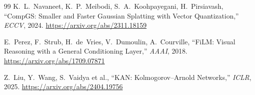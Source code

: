 \begin{thebibliography}{99}
 K.~L.~Navaneet, K.~P.~Meibodi, S.~A.~Koohpayegani, H.~Pirsiavash,
``CompGS: Smaller and Faster Gaussian Splatting with Vector Quantization,''
\textit{ECCV}, 2024. \url{https://arxiv.org/abs/2311.18159}

 E.~Perez, F.~Strub, H.~de~Vries, V.~Dumoulin, A.~Courville, ``FiLM:
Visual Reasoning with a General Conditioning Layer,'' \textit{AAAI}, 2018.
\url{https://arxiv.org/abs/1709.07871}

 Z.~Liu, Y.~Wang, S.~Vaidya et al., ``KAN: Kolmogorov--Arnold
Networks,'' \textit{ICLR}, 2025. \url{https://arxiv.org/abs/2404.19756}
\end{thebibliography}
